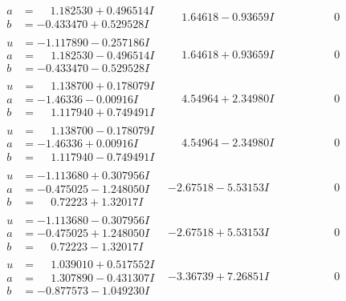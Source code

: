 \documentclass[1p]{elsarticle_modified}
\theoremstyle{definition}
\begin{document}
$$\begin{array}{c|c|c}
\begin{aligned}
a &= \phantom{-}1.182530 + 0.496514 I \\
b &= -0.433470 + 0.529528 I\end{aligned}
 & \phantom{-}1.64618 - 0.93659 I & \phantom{-0.000000 } 0 \\ \hline\begin{aligned}
u &= -1.117890 - 0.257186 I \\
a &= \phantom{-}1.182530 - 0.496514 I \\
b &= -0.433470 - 0.529528 I\end{aligned}
 & \phantom{-}1.64618 + 0.93659 I & \phantom{-0.000000 } 0 \\ \hline\begin{aligned}
u &= \phantom{-}1.138700 + 0.178079 I \\
a &= -1.46336 - 0.00916 I \\
b &= \phantom{-}1.117940 + 0.749491 I\end{aligned}
 & \phantom{-}4.54964 + 2.34980 I & \phantom{-0.000000 } 0 \\ \hline\begin{aligned}
u &= \phantom{-}1.138700 - 0.178079 I \\
a &= -1.46336 + 0.00916 I \\
b &= \phantom{-}1.117940 - 0.749491 I\end{aligned}
 & \phantom{-}4.54964 - 2.34980 I & \phantom{-0.000000 } 0 \\ \hline\begin{aligned}
u &= -1.113680 + 0.307956 I \\
a &= -0.475025 - 1.248050 I \\
b &= \phantom{-}0.72223 + 1.32017 I\end{aligned}
 & -2.67518 - 5.53153 I & \phantom{-0.000000 } 0 \\ \hline\begin{aligned}
u &= -1.113680 - 0.307956 I \\
a &= -0.475025 + 1.248050 I \\
b &= \phantom{-}0.72223 - 1.32017 I\end{aligned}
 & -2.67518 + 5.53153 I & \phantom{-0.000000 } 0 \\ \hline\begin{aligned}
u &= \phantom{-}1.039010 + 0.517552 I \\
a &= \phantom{-}1.307890 - 0.431307 I \\
b &= -0.877573 - 1.049230 I\end{aligned}
 & -3.36739 + 7.26851 I & \phantom{-0.000000 } 0 \\ \hline\begin{aligned}

\end{aligned}
\end{array}$$
\end{document}
